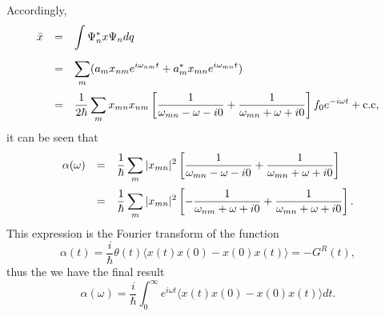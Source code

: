 \documentclass{book}
\newcommand{\average}[1]{\langle#1\rangle}
\numberwithin{equation}{section}
\begin{document}
Accordingly,
\begin{equation}
  \begin{array}{rcl}
    \bar{x}&=&\displaystyle\int \Psi_n^*x\Psi_ndq\\\vbox to 20pt{}
    &=&\displaystyle\sum_m(a_mx_{nm}e^{i\omega_{nm}t}+
    a^*_{m}x_{mn}e^{i\omega_{mn}t})\\\vbox to 20pt{}
    &=&\displaystyle\frac{1}{2\hbar}\sum_mx_{mn}x_{nm}\left[
      \frac{1}{\omega_{mn}-\omega-i0}+\frac{1}{\omega_{mn}+\omega+i0}
      \right]f_0e^{-i\omega t}+\hbox{c.c},
  \end{array}
\end{equation}
it can be seen that
\begin{equation}
  \begin{array}{rcl}
    \alpha(\omega)&=&\displaystyle\frac{1}{\hbar}\sum_m|x_{mn}|^2\left[
      \frac{1}{\omega_{mn}-\omega-i0}+\frac{1}{\omega_{mn}+\omega+i0}
      \right]\\\vbox to 20pt{}
    &=&\displaystyle\frac{1}{\hbar}\sum_m|x_{mn}|^2\left[
      -\frac{1}{\omega_{nm}+\omega+i0}+\frac{1}{\omega_{mn}+\omega+i0}
      \right].
  \end{array}
\end{equation}
This expression is the Fourier transform of the function
\begin{equation}
  \alpha(t)=\frac{i}{\hbar}\theta(t)\average{x(t)x(0)-x(0)x(t)}=-G^R(t),
\end{equation}
thus the we have the final result
\begin{equation}
  \alpha(\omega)=\frac{i}{\hbar}\int_0^\infty e^{i\omega t}
  \average{x(t)x(0)-x(0)x(t)}dt.
\end{equation}
\end{document}
